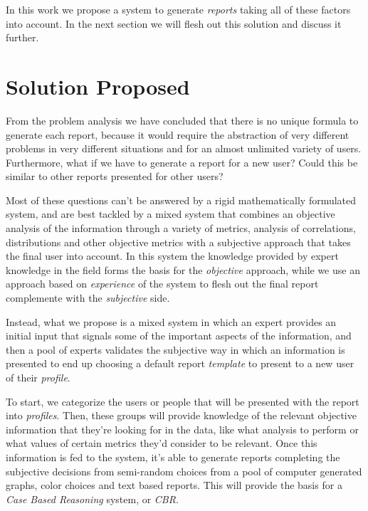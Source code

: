 In this work we propose a system to generate \textit{reports} taking all of these factors into account. In the next section we will flesh out this solution and discuss it further.

\section{Solution Proposed}
\label{cap1:sec:solution}

From the problem analysis we have concluded that there is no unique formula to generate each report, because it would require the abstraction of very different problems in very different situations and for an almost unlimited variety of users. 
Furthermore, what if we have to generate a report for a new user? Could this be similar to other reports presented for other users? 

Most of these questions can't be answered by a rigid mathematically formulated system, and are best tackled by a mixed system that combines an objective analysis of the information through a variety of metrics, analysis of correlations, distributions and other objective metrics with a subjective approach that takes the final user into account.
In this system the knowledge provided by expert knowledge in the field forms the basis for the \textit{objective} approach, while we use an approach based on \textit{experience} of the system to flesh out the final report complemente with the \textit{subjective} side.

Instead, what we propose is a mixed system in which an expert provides an initial input that signals some of the important aspects of the information, and then a pool of experts validates the subjective way in which an information is presented to end up choosing a default report \textit{template} to present to a new user of their \textit{profile}.

To start, we categorize the users or people that will be presented with the report into \textit{profiles}. Then, these groups will provide knowledge of the relevant objective information that they're looking for in the data, like what analysis to perform or what values of certain metrics they'd consider to be relevant.
Once this information is fed to the system, it's able to generate reports completing the subjective decisions from semi-random choices from a pool of computer generated graphs, color choices and text based reports. This will provide the basis for a \textit{Case Based Reasoning} system, or \textit{CBR}.

